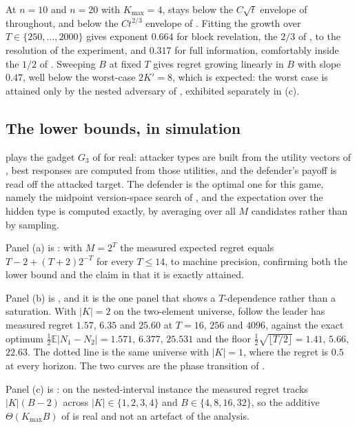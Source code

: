 \documentclass[letterpaper,9pt,twocolumn]{extarticle}
\newcommand{\EE}{\mathbb{E}}
\newcommand{\Kmax}{K_{\max}}
\theoremstyle{plain}
\theoremstyle{definition}
\theoremstyle{remark}
\begin{document}
At $n=10$ and $n=20$ with $\Kmax=4$,  stays below the $C\sqrt t$
envelope of  throughout, and  below the
$Ct^{2/3}$ envelope of . Fitting the growth over
$T\in\{250,\dots,2000\}$ gives exponent $0.664$ for block revelation, the
$2/3$ of , to the resolution of the experiment, and
$0.317$ for full information, comfortably inside the $1/2$ of
. Sweeping $B$ at fixed $T$ gives regret growing linearly in
$B$ with slope $0.47$, well below the worst-case $2K'=8$, which is expected:
the worst case is attained only by the nested adversary of
, exhibited separately in (c).

\subsection{The lower bounds, in simulation}
\label{sec:exp-imp}


 plays the gadget $G_3$ of  for real:
attacker types are built from the utility vectors of ,
best responses are computed from those utilities, and the defender's payoff
is read off the attacked target. The defender is the optimal one for this
game, namely the midpoint version-space search of ,
and the expectation over the hidden type is computed exactly, by averaging
over all $M$ candidates rather than by sampling.

Panel (a) is : with $M=2^{T}$ the measured expected
regret equals $T-2+(T+2)2^{-T}$ for every $T\le 14$, to machine precision,
confirming both the lower bound and the claim in  that it
is exactly attained.

Panel (b) is , and it is the one panel that shows a
$T$-dependence rather than a saturation. With $|K|=2$ on the two-element
universe, follow the leader has measured regret $1.57$, $6.35$ and $25.60$ at
$T=16$, $256$ and $4096$, against the exact optimum
$\tfrac12\EE|N_1-N_2|=1.571$, $6.377$, $25.531$ and the floor
$\tfrac12\sqrt{\lfloor T/2\rfloor}=1.41$, $5.66$, $22.63$. The dotted line is
the same universe with $|K|=1$, where the regret is $0.5$ at every horizon.
The two curves are the phase transition of .

Panel (c) is : on the nested-interval instance the measured
regret tracks $|K|(B-2)$ across $|K|\in\{1,2,3,4\}$ and
$B\in\{4,8,16,32\}$, so the additive $\Theta(\Kmax B)$ of  is
real and not an artefact of the analysis.
\end{document}
